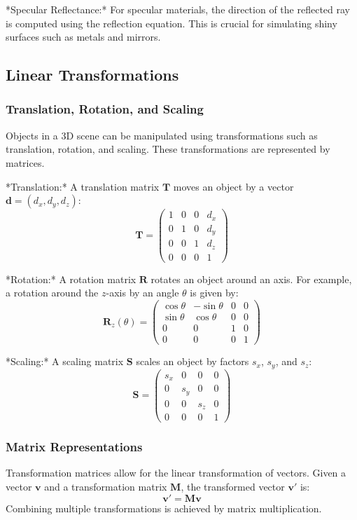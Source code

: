 \documentclass[12pt]{article}
\begin{document}
*Specular Reflectance:* For specular materials, the direction of the reflected ray is computed using the reflection equation. This is crucial for simulating shiny surfaces such as metals and mirrors.

\subsection{Linear Transformations}
\subsubsection{Translation, Rotation, and Scaling}
Objects in a 3D scene can be manipulated using transformations such as translation, rotation, and scaling. These transformations are represented by matrices.

*Translation:* A translation matrix \(\mathbf{T}\) moves an object by a vector \(\mathbf{d} = (d_x, d_y, d_z)\):
\[
    \mathbf{T} = \begin{pmatrix}
        1 & 0 & 0 & d_x \\
        0 & 1 & 0 & d_y \\
        0 & 0 & 1 & d_z \\
        0 & 0 & 0 & 1
    \end{pmatrix}
\]

*Rotation:* A rotation matrix \(\mathbf{R}\) rotates an object around an axis. For example, a rotation around the \(z\)-axis by an angle \(\theta\) is given by:
\[
    \mathbf{R}_z(\theta) = \begin{pmatrix}
        \cos \theta & -\sin \theta & 0 & 0 \\
        \sin \theta & \cos \theta  & 0 & 0 \\
        0           & 0            & 1 & 0 \\
        0           & 0            & 0 & 1
    \end{pmatrix}
\]

*Scaling:* A scaling matrix \(\mathbf{S}\) scales an object by factors \(s_x\), \(s_y\), and \(s_z\):
\[
    \mathbf{S} = \begin{pmatrix}
        s_x & 0   & 0   & 0 \\
        0   & s_y & 0   & 0 \\
        0   & 0   & s_z & 0 \\
        0   & 0   & 0   & 1
    \end{pmatrix}
\]

\subsubsection{Matrix Representations}
Transformation matrices allow for the linear transformation of vectors. Given a vector \(\mathbf{v}\) and a transformation matrix \(\mathbf{M}\), the transformed vector \(\mathbf{v}'\) is:
\[
    \mathbf{v}' = \mathbf{M} \mathbf{v}
\]
Combining multiple transformations is achieved by matrix multiplication.
\end{document}
